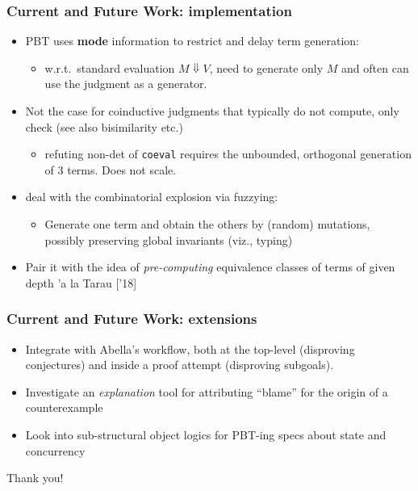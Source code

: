 \documentclass{beamer}
\newcommand{\red}[1]{{\color{red} #1}}
\newenvironment{myslide}[1]
    {\begin{frame}\frametitle{#1}}
    {\end{frame}}
\begin{document}
\begin{myslide}{Current and Future Work: implementation}
  \begin{itemize}
  \item PBT uses \textbf{mode} information to restrict and delay term generation:
    \begin{itemize}
    \item w.r.t.\ standard evaluation $M\Downarrow V$,  need to generate only $M$ and often can use the judgment  as a generator.
    \end{itemize}
  \item Not the case for coinductive judgments that typically do not compute, only check (see also bisimilarity etc.)
    \begin{itemize}
    \item refuting non-det of \texttt{coeval} requires the unbounded, orthogonal generation of 3 terms. Does not scale.
    \end{itemize}
  \item deal with the combinatorial explosion via \red{fuzzying}:
    \begin{itemize}
    \item Generate one term and obtain the others by (random)
      mutations, possibly preserving global invariants (viz.,
      typing) %
    \end{itemize}
  \item Pair it with the idea of \emph{pre-computing} equivalence
    classes of terms of given depth 'a la Tarau ['18]
  \end{itemize}
  \end{myslide}
\begin{myslide}{Current and Future Work: extensions}
  \begin{itemize}
  \item Integrate with Abella's workflow, both at the top-level
    (disproving conjectures) and inside a proof attempt (disproving
    subgoals).    
\item  Investigate an \emph{explanation} tool for attributing ``blame'' for
the origin of a counterexample
  \item Look into sub-structural object logics for PBT-ing specs about state and concurrency
  \end{itemize}
\end{myslide}
\begin{frame}
  \begin{center}
    \begin{LARGE}
      Thank you!
    \end{LARGE}
  \end{center}

\end{frame}
\end{document}
